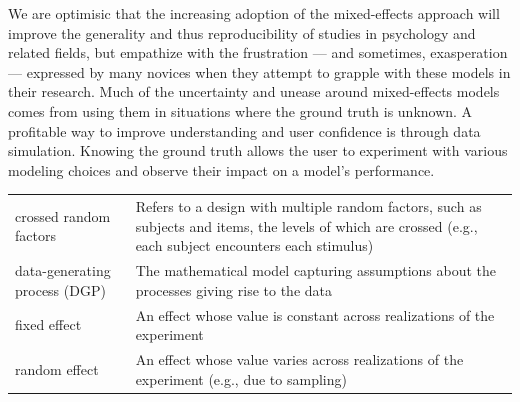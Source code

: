 \documentclass[doc,floatsintext]{apa6}
\begin{document}
We are optimisic that the increasing adoption of the mixed-effects approach will improve the generality and thus reproducibility of studies in psychology and related fields, but empathize with the frustration --- and sometimes, exasperation --- expressed by many novices when they attempt to grapple with these models in their research. Much of the uncertainty and unease around mixed-effects models comes from using them in situations where the ground truth is unknown. A profitable way to improve understanding and user confidence is through data simulation. Knowing the ground truth allows the user to experiment with various modeling choices and observe their impact on a model's performance.

\begin{tcolorbox}[colback=black!5!white,colframe=white!5!black,title=Box 1. Glossary of terms]
\begin{longtable}[]{@{}ll@{}}
\begin{minipage}[t]{0.29\columnwidth}\raggedright
crossed random factors\strut
\end{minipage} & \begin{minipage}[t]{0.65\columnwidth}\raggedright
Refers to a design with multiple random factors, such as subjects and items, the levels of which are crossed (e.g., each subject encounters each stimulus) \strut
\end{minipage}\tabularnewline
\begin{minipage}[t]{0.29\columnwidth}\raggedright
data-generating process (DGP)\strut
\end{minipage} & \begin{minipage}[t]{0.65\columnwidth}\raggedright
The mathematical model capturing assumptions about the processes giving rise to the data\strut
\end{minipage}\tabularnewline
\begin{minipage}[t]{0.29\columnwidth}\raggedright
fixed effect\strut
\end{minipage} & \begin{minipage}[t]{0.65\columnwidth}\raggedright
An effect whose value is constant across realizations of the experiment\strut
\end{minipage}\tabularnewline
\begin{minipage}[t]{0.29\columnwidth}\raggedright
random effect\strut
\end{minipage} & \begin{minipage}[t]{0.65\columnwidth}\raggedright
An effect whose value varies across realizations of the experiment (e.g., due to sampling)\strut

\end{minipage}
\end{longtable}
\end{tcolorbox}
\end{document}

